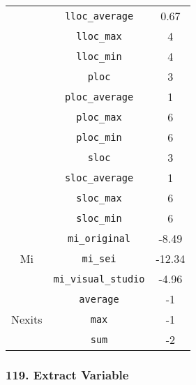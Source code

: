 \begin{center}
\begin{tabular}{ |c|c|c| }
          & \verb|lloc_average|                   & 0.67       \\
          & \verb|lloc_max|                       & 4          \\
          & \verb|lloc_min|                       & 4          \\
          & \verb|ploc|                           & 3          \\
          & \verb|ploc_average|                   & 1          \\
          & \verb|ploc_max|                       & 6          \\
          & \verb|ploc_min|                       & 6          \\
          & \verb|sloc|                           & 3          \\
          & \verb|sloc_average|                   & 1          \\
          & \verb|sloc_max|                       & 6          \\
          & \verb|sloc_min|                       & 6          \\
    \hline
    \multirow{ 3 }{6em}{ Mi }
          & \verb|mi_original|                    & -8.49      \\
          & \verb|mi_sei|                         & -12.34     \\
          & \verb|mi_visual_studio|               & -4.96      \\
    \hline
    \multirow{ 3 }{6em}{ Nexits }
          & \verb|average|                        & -1         \\
          & \verb|max|                            & -1         \\
          & \verb|sum|                            & -2         \\
    \hline
  \end{tabular}
\end{center}
\subsubsection{ 119. Extract Variable }

